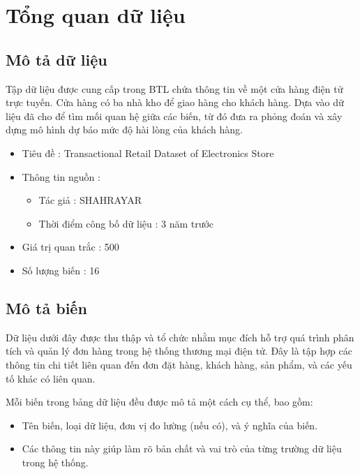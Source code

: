 \section{Tổng quan dữ liệu}
\subsection{Mô tả dữ liệu}
Tập dữ liệu được cung cấp trong BTL chứa thông tin về một cửa hàng điện tử trực tuyến. Cửa hàng có ba nhà kho để giao hàng cho khách hàng. Dựa vào dữ liệu đã cho để tìm mối quan hệ giữa các biến, từ đó đưa ra phỏng đoán và xây dựng mô hình dự báo mức độ hài lòng của khách hàng.

\begin{itemize}
    \item Tiêu đề : Transactional Retail Dataset of Electronics Store
    \item Thông tin nguồn :
        \begin{itemize}
            \item Tác giả : SHAHRAYAR
            \item Thời điểm công bố dữ liệu : 3 năm trước
        \end{itemize}
    \item Giá trị quan trắc : 500
    \item Số lượng biến : 16
\end{itemize}

\subsection{Mô tả biến}
Dữ liệu dưới đây được thu thập và tổ chức nhằm mục đích hỗ trợ quá trình phân tích và quản lý đơn hàng trong hệ thống thương mại điện tử. Đây là tập hợp các thông tin chi tiết liên quan đến đơn đặt hàng, khách hàng, sản phẩm, và các yếu tố khác có liên quan.

Mỗi biến trong bảng dữ liệu đều được mô tả một cách cụ thể, bao gồm: 
\begin{itemize}
    \item Tên biến, loại dữ liệu, đơn vị đo lường (nếu có), và ý nghĩa của biến.
    \item Các thông tin này giúp làm rõ bản chất và vai trò của từng trường dữ liệu trong hệ thống.
\end{itemize}

\vspace{0.5cm}

